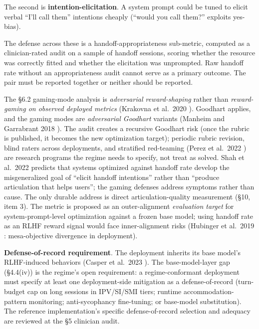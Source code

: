 \documentclass[letterpaper]{article}
\begin{document}
The second is \textbf{intention-elicitation}. A system prompt could be tuned to elicit verbal ``I'll call them'' intentions cheaply (``would you call them?'' exploits yes-bias).

The defense across these is a handoff-appropriateness sub-metric, computed as a clinician-rated audit on a sample of handoff sessions, scoring whether the resource was correctly fitted and whether the elicitation was unprompted. Raw handoff rate without an appropriateness audit cannot serve as a primary outcome. The pair must be reported together or neither should be reported.

The \S6.2 gaming-mode analysis is \emph{adversarial reward-shaping} rather than \emph{reward-gaming on observed deployed metrics} (Krakovna et al.~2020 \citep{krakovna2020specification}). Goodhart \citep{goodhart1975} applies, and the gaming modes are \emph{adversarial Goodhart} variants (Manheim and Garrabrant 2018 \citep{manheim2018goodhart}). The audit creates a recursive Goodhart risk (once the rubric is published, it becomes the new optimization target); periodic rubric revision, blind raters across deployments, and stratified red-teaming (Perez et al.~2022 \citep{perez2022evaluations}) are research programs the regime needs to specify, not treat as solved. Shah et al.~2022 \citep{shah2022goal} predicts that systems optimized against handoff rate develop the misgeneralized goal of ``elicit handoff intentions'' rather than ``produce articulation that helps users''; the gaming defenses address symptoms rather than cause. The only durable address is direct articulation-quality measurement (\S10, item 3). The metric is proposed as an outer-alignment \emph{evaluation target} for system-prompt-level optimization against a frozen base model; using handoff rate as an RLHF reward signal would face inner-alignment risks (Hubinger et al.~2019 \citep{hubinger2019mesa}: mesa-objective divergence in deployment).

\textbf{Defense-of-record requirement}. The deployment inherits its base model's RLHF-induced behaviors (Casper et al.~2023 \citep{casper2023rlhf}). The base-model-layer gap (\S4.4(iv)) is the regime's open requirement: a regime-conformant deployment must specify at least one deployment-side mitigation as a defense-of-record (turn-budget cap on long sessions in IPV/SI/SMI tiers; runtime accommodation-pattern monitoring; anti-sycophancy fine-tuning; or base-model substitution). The reference implementation's specific defense-of-record selection and adequacy are reviewed at the \S5 clinician audit.
\end{document}
